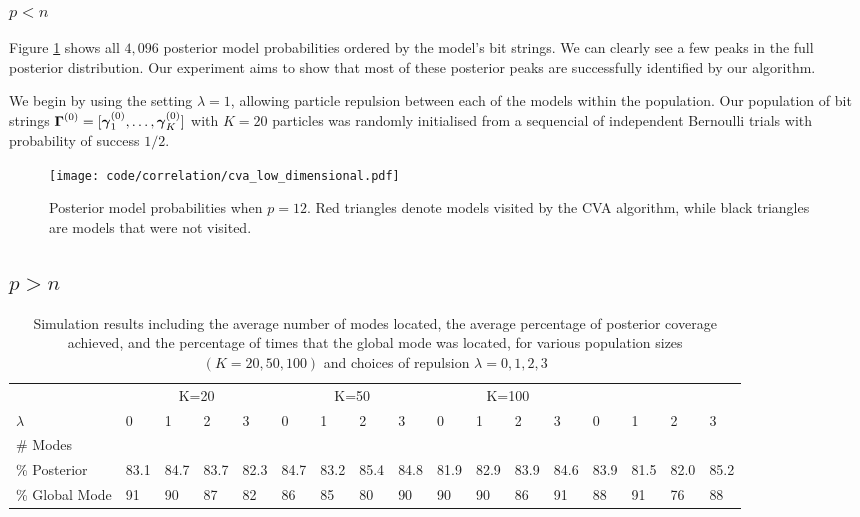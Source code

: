 \documentclass{amsart}[12pt]
\begin{document}
\subsubsection{$p < n$}
Figure \ref{fig:cva_posterior_models} shows all $4,096$ posterior model probabilities ordered by the model's bit
strings. We can clearly see a few peaks in the full posterior distribution. Our experiment aims to show that
most of these posterior peaks are successfully identified by our algorithm.

We begin by using the setting $\lambda = 1$, allowing particle repulsion between each of the models within the
population. Our population of bit strings ${\boldsymbol \Gamma}^{(0)} = [{\boldsymbol \gamma}_1^{(0)}, \ldots, {\boldsymbol \gamma}_K^{(0)}]$ with
$K = 20$ particles was randomly initialised from a sequencial of independent Bernoulli trials with probability
of success $1/2$.

\begin{figure}	
	\caption{Posterior model probabilities when $p = 12$. Red triangles denote models visited by the CVA
						algorithm, while black triangles are models that were not visited.}
	\label{fig:cva_posterior_models}
	\texttt{[image: code/correlation/cva\_low\_dimensional.pdf]}
\end{figure}

\subsection{$p > n$}

\begin{table}
	\caption{Simulation results including the average number of modes located, the average percentage of
	posterior coverage achieved, and the percentage of times that the global mode was located, for various
	population sizes $(K=20, 50, 100)$ and choices of repulsion $\lambda=0, 1, 2, 3$}
	\label{tab:result2}
	\begin{tabular}{l|llll|llll|llll|llll}
	\hline
	 					& \multicolumn{4}{c}{K=20} 	& \multicolumn{4}{c}{K=50} & \multicolumn{4}{c}{K=100} \\
	$\lambda$ & 0 & 1 & 2 & 3 & 0 & 1 & 2 & 3 & 0 & 1 & 2 & 3 & 0 & 1 & 2 & 3 \\
	\hline
	\# Modes & \\
	\% Posterior & 83.1 & 84.7 & 83.7 & 82.3 & 84.7 & 83.2 & 85.4 & 84.8 & 81.9 & 82.9 & 83.9 & 84.6 & 83.9 & 81.5 & 82.0 & 85.2 \\
	\% Global Mode & 91 & 90 & 87 & 82 & 86 & 85 & 80 & 90 & 90 & 90 & 86 & 91 & 88 & 91 & 76 & 88 \\
	\hline
	\end{tabular}

\end{table}
\end{document}
